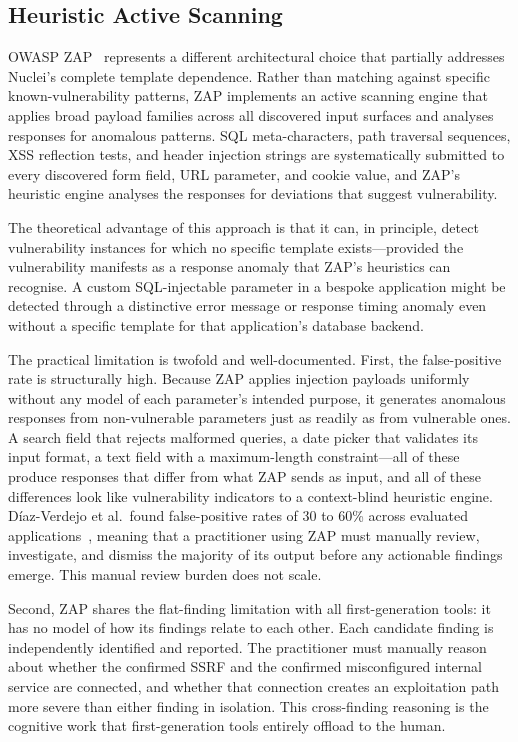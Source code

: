 \documentclass[12pt,a4paper,oneside,openany]{book}
\newcommand{\toolname}[1]{\textsf{#1}}
\begin{document}
\subsection{Heuristic Active Scanning}

\toolname{OWASP ZAP}~\citep{owaspzap} represents a different architectural choice that partially addresses Nuclei's complete template dependence. Rather than matching against specific known-vulnerability patterns, ZAP implements an active scanning engine that applies broad payload families across all discovered input surfaces and analyses responses for anomalous patterns. SQL meta-characters, path traversal sequences, XSS reflection tests, and header injection strings are systematically submitted to every discovered form field, URL parameter, and cookie value, and ZAP's heuristic engine analyses the responses for deviations that suggest vulnerability.

The theoretical advantage of this approach is that it can, in principle, detect vulnerability instances for which no specific template exists---provided the vulnerability manifests as a response anomaly that ZAP's heuristics can recognise. A custom SQL-injectable parameter in a bespoke application might be detected through a distinctive error message or response timing anomaly even without a specific template for that application's database backend.

The practical limitation is twofold and well-documented. First, the false-positive rate is structurally high. Because ZAP applies injection payloads uniformly without any model of each parameter's intended purpose, it generates anomalous responses from non-vulnerable parameters just as readily as from vulnerable ones. A search field that rejects malformed queries, a date picker that validates its input format, a text field with a maximum-length constraint---all of these produce responses that differ from what ZAP sends as input, and all of these differences look like vulnerability indicators to a context-blind heuristic engine. D\'{i}az-Verdejo et al.\ found false-positive rates of 30 to 60\% across evaluated applications~\citep{diaz2022evaluation}, meaning that a practitioner using ZAP must manually review, investigate, and dismiss the majority of its output before any actionable findings emerge. This manual review burden does not scale.

Second, ZAP shares the flat-finding limitation with all first-generation tools: it has no model of how its findings relate to each other. Each candidate finding is independently identified and reported. The practitioner must manually reason about whether the confirmed SSRF and the confirmed misconfigured internal service are connected, and whether that connection creates an exploitation path more severe than either finding in isolation. This cross-finding reasoning is the cognitive work that first-generation tools entirely offload to the human.
\end{document}
